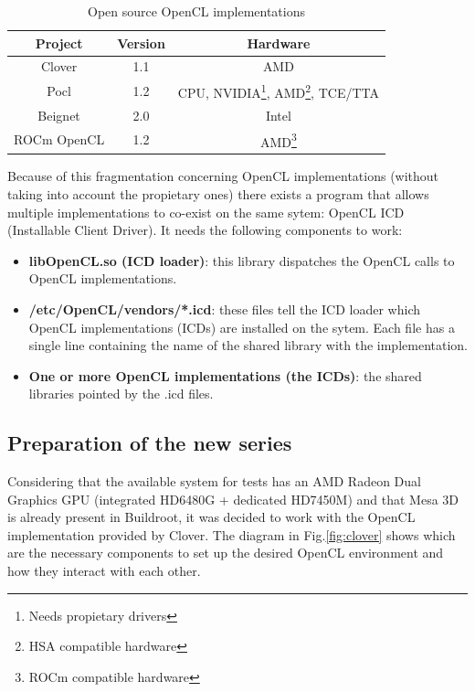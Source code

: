 \documentclass[12pt,a4paper,oneside]{article}
\begin{document}
\begin{table}[h!]
  \begin{center}
    \caption{Open source OpenCL implementations}
    \label{tab:opencl_implementations}
    \begin{tabular}{c|c|c}
    Project & Version & Hardware \\
    \hline
    Clover & 1.1 & AMD\\
    Pocl & 1.2 & CPU, NVIDIA\footnote{Needs propietary drivers}, AMD\footnote{HSA
    compatible hardware}, TCE/TTA\\
    Beignet & 2.0 & Intel\\
    ROCm OpenCL & 1.2 & AMD\footnote{ROCm compatible hardware}\\
    \end{tabular}
  \end{center}
\end{table}
Because of this fragmentation concerning OpenCL implementations (without taking
into account the propietary ones) there exists a program that allows multiple
implementations to co-exist on the same sytem: OpenCL ICD (Installable Client
Driver). It needs the following components to work:
\begin{itemize}
  \item \textbf{libOpenCL.so (ICD loader)}: this library dispatches the OpenCL
  calls to OpenCL implementations.
  \item \textbf{/etc/OpenCL/vendors/*.icd}: these files tell the ICD loader which
  OpenCL implementations (ICDs) are installed on the sytem. Each file has a single
  line containing the name of the shared library with the implementation.
  \item \textbf{One or more OpenCL implementations (the ICDs)}: the shared libraries
  pointed by the .icd files.
\end{itemize}

\newpage
\subsection*{Preparation of the new series}
Considering that the available system for tests has an AMD Radeon Dual Graphics
GPU (integrated HD6480G + dedicated HD7450M) and that Mesa 3D is already present
in Buildroot, it was decided to work with the OpenCL implementation provided by
Clover. The diagram in Fig.\ref{fig:clover} shows which are the necessary
components to set up the desired OpenCL environment and how they interact with
each other.
\end{document}
